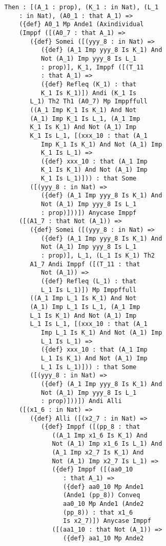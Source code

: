 \documentclass{article}
\begin{document}
\begin{verbatim}
   Then : [(A_1 : prop), (K_1 : in Nat), (L_1 
       : in Nat), (A0_1 : that A_1) => 
       ({def} A0_1 Mp Ande1 (Axindividual 
       (Imppf ([(A0_7 : that A_1) => 
          ({def} Somei ([(yyy_8 : in Nat) => 
             ({def} (A_1 Imp yyy_8 Is K_1) And 
             Not (A_1) Imp yyy_8 Is L_1 
             : prop)], K_1, Imppf ([(T_11 
             : that A_1) => 
             ({def} Refleq (K_1) : that 
             K_1 Is K_1)]) Andi (K_1 Is 
          L_1) Th2 Th1 (A0_7) Mp Imppffull 
          ((A_1 Imp K_1 Is K_1) And Not 
          (A_1) Imp K_1 Is L_1, (A_1 Imp 
          K_1 Is K_1) And Not (A_1) Imp 
          K_1 Is L_1, [(xxx_10 : that (A_1 
             Imp K_1 Is K_1) And Not (A_1) Imp 
             K_1 Is L_1) => 
             ({def} xxx_10 : that (A_1 Imp 
             K_1 Is K_1) And Not (A_1) Imp 
             K_1 Is L_1)])) : that Some 
          ([(yyy_8 : in Nat) => 
             ({def} (A_1 Imp yyy_8 Is K_1) And 
             Not (A_1) Imp yyy_8 Is L_1 
             : prop)]))]) Anycase Imppf 
       ([(A1_7 : that Not (A_1)) => 
          ({def} Somei ([(yyy_8 : in Nat) => 
             ({def} (A_1 Imp yyy_8 Is K_1) And 
             Not (A_1) Imp yyy_8 Is L_1 
             : prop)], L_1, (L_1 Is K_1) Th2 
          A1_7 Andi Imppf ([(T_11 : that 
             Not (A_1)) => 
             ({def} Refleq (L_1) : that 
             L_1 Is L_1)]) Mp Imppffull 
          ((A_1 Imp L_1 Is K_1) And Not 
          (A_1) Imp L_1 Is L_1, (A_1 Imp 
          L_1 Is K_1) And Not (A_1) Imp 
          L_1 Is L_1, [(xxx_10 : that (A_1 
             Imp L_1 Is K_1) And Not (A_1) Imp 
             L_1 Is L_1) => 
             ({def} xxx_10 : that (A_1 Imp 
             L_1 Is K_1) And Not (A_1) Imp 
             L_1 Is L_1)])) : that Some 
          ([(yyy_8 : in Nat) => 
             ({def} (A_1 Imp yyy_8 Is K_1) And 
             Not (A_1) Imp yyy_8 Is L_1 
             : prop)]))]) Andi Alli 
       ([(x1_6 : in Nat) => 
          ({def} Alli ([(x2_7 : in Nat) => 
             ({def} Imppf ([(pp_8 : that 
                ((A_1 Imp x1_6 Is K_1) And 
                Not (A_1) Imp x1_6 Is L_1) And 
                (A_1 Imp x2_7 Is K_1) And 
                Not (A_1) Imp x2_7 Is L_1) => 
                ({def} Imppf ([(aa0_10 
                   : that A_1) => 
                   ({def} aa0_10 Mp Ande1 
                   (Ande1 (pp_8)) Conveq 
                   aa0_10 Mp Ande1 (Ande2 
                   (pp_8)) : that x1_6 
                   Is x2_7)]) Anycase Imppf 
                ([(aa1_10 : that Not (A_1)) => 
                   ({def} aa1_10 Mp Ande2 

\end{verbatim}
\end{document}
